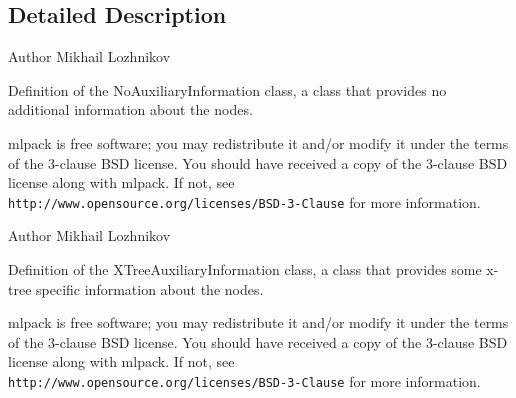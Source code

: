 \subsection{Detailed Description}
\begin{DoxyAuthor}{Author}
Mikhail Lozhnikov
\end{DoxyAuthor}
Definition of the No\+Auxiliary\+Information class, a class that provides no additional information about the nodes.

mlpack is free software; you may redistribute it and/or modify it under the terms of the 3-\/clause B\+SD license. You should have received a copy of the 3-\/clause B\+SD license along with mlpack. If not, see {\tt http\+://www.\+opensource.\+org/licenses/\+B\+S\+D-\/3-\/\+Clause} for more information.

\begin{DoxyAuthor}{Author}
Mikhail Lozhnikov
\end{DoxyAuthor}
Definition of the X\+Tree\+Auxiliary\+Information class, a class that provides some x-\/tree specific information about the nodes.

mlpack is free software; you may redistribute it and/or modify it under the terms of the 3-\/clause B\+SD license. You should have received a copy of the 3-\/clause B\+SD license along with mlpack. If not, see {\tt http\+://www.\+opensource.\+org/licenses/\+B\+S\+D-\/3-\/\+Clause} for more information. 